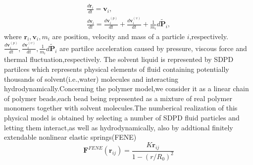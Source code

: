 \documentclass[aps,prl,twocolumn,showpacs,superscriptaddress,groupedaddress]{revtex4}  %
\begin{document}
\begin{eqnarray}\label{equ:momesum}
 \frac{d\mathbf{r}_i}{dt}=\mathbf{v}_i,\\
\frac{d\mathbf{v}_i}{dt}=\frac{d\mathbf{v}_{i}^{(p)}}{dt}+\frac{d\mathbf{v}_{i}^{(\upsilon)}}{dt}+\frac{1}{m_i}d\tilde{\mathbf{P}}_i,
\end{eqnarray}
where $\mathbf{r}_i,\mathbf{v}_i,m_i$ are position, velocity and mass of a particle $i$,respectively.
$\frac{d\mathbf{v}_{i}^{(p)}}{dt},\frac{d\mathbf{v}_{i}^{(\upsilon)}}{dt},\frac{1}{m_i}d\tilde{\mathbf{P}}_i $ are partilce acceleration caused by pressure,
viscous force and thermal fluctuation,respectively.
The solvent liquid is represented by SDPD partilces which represents physical elements of fluid containing potentially thousands of solvent(i.e.,water)
 molecules and interacting hydrodynamically.Concerning the polymer model,we consider it as a linear chain of polymer beads,each bead 
being represented as a mixture of real polymer monomers together with solvent molecules.The numberical realization of this physical model is obtained by selecting a number of
SDPD fluid particles and letting them interact,as well as hydrodynamically, also by addtional finitely extendable nonlinear elastic springs(FENE) 
\begin{equation}\label{equ:fene}
 \mathbf{F}^{FENE}(\mathbf{r}_{ij})=\frac{K\mathbf{r}_{ij}}{1-(r/R_0)^2}
\end{equation}
\end{document}
